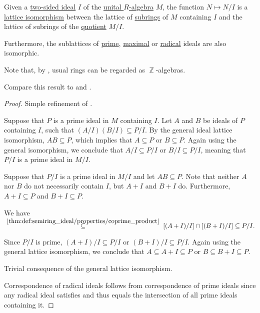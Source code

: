 \begin{theorem}\label{thm:quotient_ideal_lattice_theorem}
  Given a \hyperref[def:semiring_ideal]{two-sided ideal} \( I \) of the \hyperref[def:algebra_over_ring]{unital \( R \)-algebra} \( M \), the function \( N \mapsto N / I \) is a \hyperref[def:semilattice/homomorphism]{lattice isomorphism} between the lattice of \hyperref[def:ring/submodel]{subrings} of \( M \) containing \( I \) and the lattice of subrings of the \hyperref[def:ring/quotient]{quotient} \( M / I \).

  Furthermore, the sublattices of \hyperref[def:semiring_ideal/prime]{prime}, \hyperref[def:semiring_ideal/maximal]{maximal} or \hyperref[def:radical_ideal]{radical} ideals are also isomorphic.

  Note that, by , usual rings can be regarded as \( \BbbZ \)-algebras.

  Compare this result to  and .
\end{theorem}
\begin{proof}
   Simple refinement of .

  \SufficiencySubProof* Suppose that \( P \) is a prime ideal in \( M \) containing \( I \). Let \( A \) and \( B \) be ideals of \( P \) containing \( I \), such that \( (A / I) (B / I) \subseteq P / I \). By the general ideal lattice isomorphism, \( AB \subseteq P \), which implies that \( A \subseteq P \) or \( B \subseteq P \). Again using the general isomorphism, we conclude that \( A / I \subseteq P / I \) or \( B / I \subseteq P / I \), meaning that \( P / I \) is a prime ideal in \( M / I \).

  \NecessitySubProof* Suppose that \( P / I \) is a prime ideal in \( M / I \) and let \( AB \subseteq P \). Note that neither \( A \) nor \( B \) do not necessarily contain \( I \), but \( A + I \) and \( B + I \) do. Furthermore, \( A + I \subseteq P \) and \( B + I \subseteq P \).

  We have
  \begin{equation*}
    [(A + I) / I][(B + I) / I]
    \reloset {\ref{thm:def:semiring_ideal/properties/coprime_product}} \subseteq
    [(A + I) / I] \cap [(B + I) / I]
    \subseteq
    P / I.
  \end{equation*}

  Since \( P / I \) is prime, \( (A + I) / I \subseteq P / I \) or \( (B + I) / I \subseteq P / I \). Again using the general lattice isomorphism, we conclude that \( A \subseteq A + I \subseteq P \) or \( B \subseteq B + I \subseteq P \).

   Trivial consequence of the general lattice isomorphism.

   Correspondence of radical ideals follows from correspondence of prime ideals since any radical ideal satisfies  and thus equals the intersection of all prime ideals containing it.
\end{proof}

